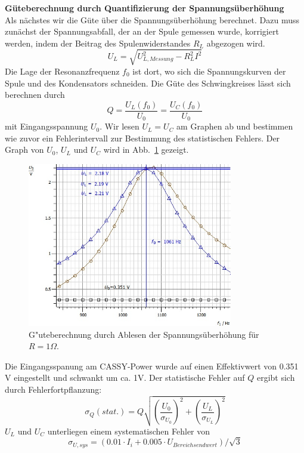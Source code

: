 \documentclass[12pt,a4paper]{article}
\begin{document}
\textbf{Güteberechnung durch Quantifizierung der Spannungsüberhöhung}\\
Als nächstes wir die Güte über die Spannungsüberhöhung berechnet. Dazu muss zunächst der Spannungsabfall, der an der Spule gemessen wurde, korrigiert werden, indem der Beitrag des Spulenwiderstandes $R_L$ abgezogen wird.
\begin{equation}
U_L=\sqrt{U_{L, Messung}^2-R_L^2I^2}
\end{equation}
Die Lage der Resonanzfrequenz $f_0$ ist dort, wo sich die Spannungskurven der Spule und des Kondensators schneiden. Die Güte des Schwingkreises lässt sich berechnen durch
\begin{equation}
Q=\frac{U_L(f_0)}{U_0}=\frac{U_C(f_0)}{U_0}
\end{equation}
mit Eingangsspannung $U_0$. Wir lesen $U_L=U_C$ am Graphen ab und bestimmen wie zuvor ein Fehlerintervall zur Bestimmung des statistischen Fehlers. Der Graph von $U_0$, $U_L$ und $U_C$ wird in Abb.~\ref{S1Ohm_U} gezeigt.
\begin{figure}[H]
	\centering
	\includegraphics[width=0.8\textwidth]{Daten/S1Ohm_U.jpg}
	\caption{G"uteberechnung durch Ablesen der Spannungsüberhöhung für $R=1\Omega$.}
	\label{S1Ohm_U}
\end{figure}
Die Eingangsspanung am CASSY-Power wurde auf einen Effektivwert von 0.351 V eingestellt und schwankt um ca. 1V. Der statistische Fehler auf $Q$ ergibt sich durch Fehlerfortpflanzung:
\begin{equation}
\sigma_Q(stat.)=Q\sqrt{\left(\frac{U_0}{\sigma_{U_0}}\right)^2+\left(\frac{U_L}{\sigma_{U_L}}\right)^2}
\end{equation}
$U_L$ und $U_C$ unterliegen einem systematischen Fehler von
\begin{equation}
\sigma_{U,sys}=(0.01\cdot I_i+0.005\cdot U_{Bereichsendwert})/\sqrt{3}
\end{equation}
\end{document}
